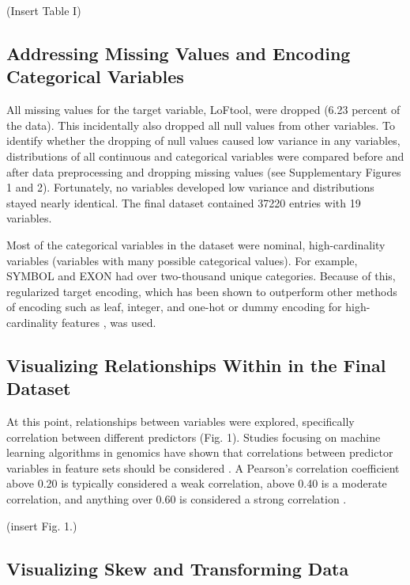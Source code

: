\documentclass[journal,two side,web]{ieeecolor}
\begin{document}
(Insert Table I) 

\subsection{Addressing Missing Values and Encoding Categorical Variables}

All missing values for the target variable, LoFtool, were dropped (6.23 percent of the data). This incidentally also dropped all null values from other variables. To identify whether the dropping of null values caused low variance in any variables, distributions of all continuous and categorical variables were compared before and after data preprocessing and dropping missing values (see Supplementary Figures 1 and 2). Fortunately, no variables developed low variance and distributions stayed nearly identical. The final dataset contained 37220 entries with 19 variables.

Most of the categorical variables in the dataset were nominal, high-cardinality variables (variables with many possible categorical values). For example, SYMBOL and EXON had over two-thousand unique categories. Because of this, regularized target encoding, which has been shown to outperform other methods of encoding such as leaf, integer, and one-hot or dummy encoding for high-cardinality features \cite{pargent2022regularized}, was used.

\subsection{Visualizing Relationships Within in the Final Dataset}

At this point, relationships between variables were explored, specifically correlation between different predictors (Fig. 1). Studies focusing on machine learning algorithms in genomics have shown that correlations between predictor variables in feature sets should be considered \cite{nicodemus2009predictor}. A Pearson’s correlation coefficient above 0.20 is typically considered a weak correlation, above 0.40 is a moderate correlation, and anything over 0.60 is considered a strong correlation \cite{bmj2020correlation}. 

(insert Fig. 1.)

\subsection{Visualizing Skew and Transforming Data}
\end{document}
